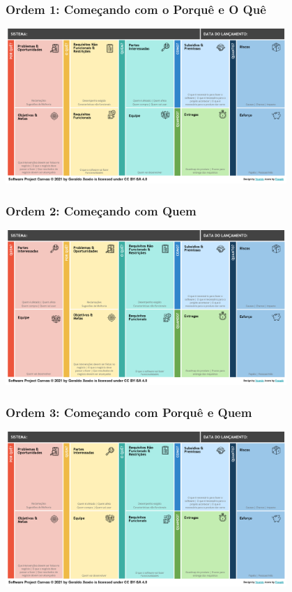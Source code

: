 \documentclass[aspectratio=169]{beamer}
\begin{document}
\begin{frame}
\frametitle{Ordem 1: Começando com o Porquê e O Quê}
\centering
\includegraphics[width=0.8\textwidth]{dist/alternativa1.png}
\end{frame}

\begin{frame}
\frametitle{Ordem 2: Começando com Quem}
\centering
\includegraphics[width=0.8\textwidth]{dist/alternativa2.png}
\end{frame}

\begin{frame}
\frametitle{Ordem 3: Começando com Porquê e Quem}
\centering
\includegraphics[width=0.8\textwidth]{dist/alternativa3.png}
\end{frame}
\end{document}
